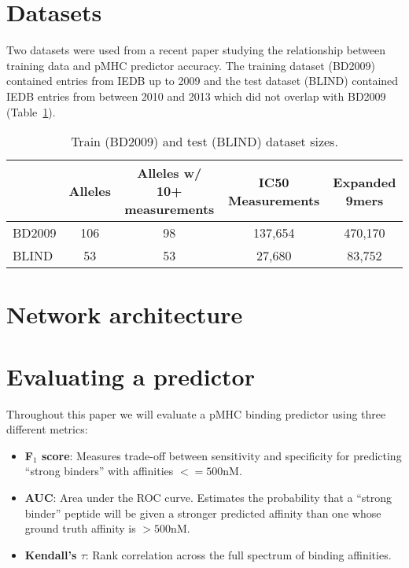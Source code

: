 \section*{Datasets}

Two datasets were used from a recent paper studying the relationship between training data and pMHC predictor accuracy\cite{Kim_2014}. The training dataset (BD2009) contained entries from IEDB\cite{Salimi_2012} up to 2009 and the test dataset (BLIND) contained IEDB entries from between 2010 and 2013 which did not overlap with BD2009 (Table~\ref{tab:datasets}).

\begin{table}[h!]
\label{tab:datasets}

\begin{tabular}{l||cccc}
\toprule
{} & Alleles & Alleles w/ 10+ measurements & IC50 Measurements & Expanded 9mers \\
\midrule
BD2009 &     106 &                          98 &           137,654 &        470,170 \\
BLIND  &      53 &                          53 &            27,680 &         83,752 \\
\bottomrule
\end{tabular}


\caption{Train (BD2009) and test (BLIND) dataset sizes.}
\end{table}

\section{Network architecture}



\section{Evaluating a predictor}

Throughout this paper we will evaluate a pMHC binding predictor using three different metrics:

\begin{itemize}

\item {\bf F$_1$ score}: Measures trade-off between sensitivity and specificity for predicting ``strong binders'' with affinities $<= 500$nM. 
\item {\bf AUC}: Area under the ROC curve. Estimates the probability that a ``strong binder'' peptide will be given a stronger predicted affinity than one whose ground truth affinity is $>500$nM. 
\item {\bf Kendall's $\tau$}: Rank correlation across the full spectrum of binding affinities.
\end{itemize}


